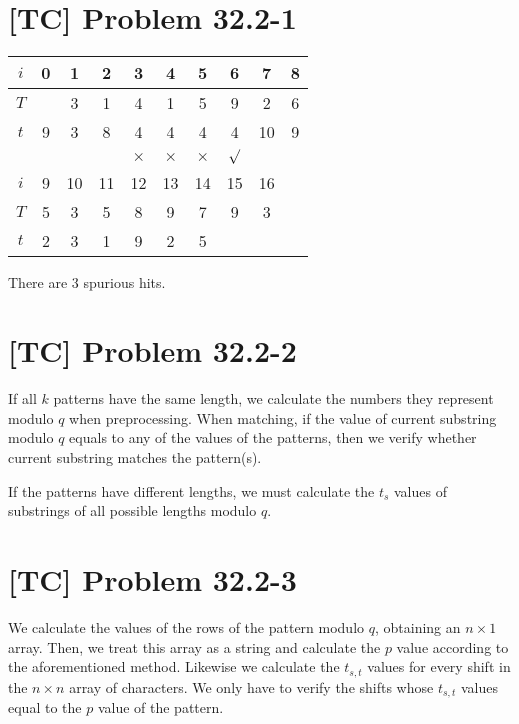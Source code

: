 \documentclass[a4paper,11pt,twocolumn]{article}
\begin{document}
  \section{[TC] Problem 32.2-1}
  \begin{table}[h]
  \centering
  \begin{tabular}{c|ccccccccc}
    \hline
    $i$ & 0 & 1 & 2 & 3 & 4 & 5 & 6 & 7 & 8 \\ \hline
    $T$ &   & 3 & 1 & 4 & 1 & 5 & 9 & 2 & 6\\ 
    $t$ & 9 & 3 & 8 & 4 & 4 & 4 & 4 & 10 & 9 \\ 
        &   &   &   & $\times$ & $\times$ & $\times$ & $\surd$ \\\hline
    $i$ & 9 & 10 & 11 & 12 & 13 & 14 & 15 & 16 \\ \hline
    $T$ & 5 & 3 & 5 & 8 & 9 & 7 & 9 & 3 \\
    $t$ & 2 & 3 & 1 & 9 & 2 & 5 &  \\ \hline
  \end{tabular}
  \end{table}
  There are 3 spurious hits.
  
  \section{[TC] Problem 32.2-2}
  If all $k$ patterns have the same length, we calculate the numbers they represent modulo $q$ when preprocessing. When matching, if the value of current substring modulo $q$ equals to any of the values of the patterns, then we verify whether current substring matches the pattern(s). \par
  If the patterns have different lengths, we must calculate the $t_s$ values of substrings of all possible lengths modulo $q$.
  
  \section{[TC] Problem 32.2-3}
  We calculate the values of the rows of the pattern modulo $q$, obtaining an $n \times 1$ array. Then, we treat this array as a string and calculate the $p$ value according to the aforementioned method. Likewise we calculate the $t_{s, t}$ values for every shift in the $n \times n$ array of characters. We only have to verify the shifts whose $t_{s,t}$ values equal to the $p$ value of the pattern.
\end{document}
